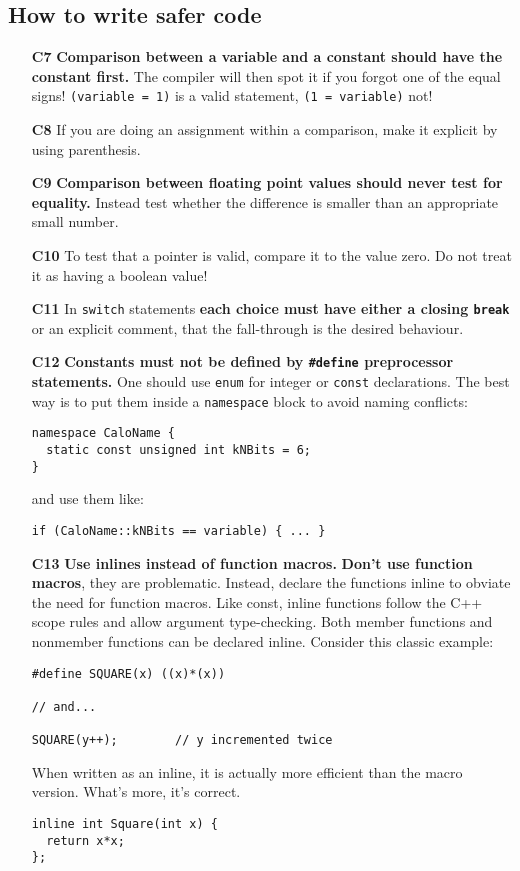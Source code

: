 \documentclass[a4paper,10pt]{article}
\begin{document}
\subsection{How to write safer code}
\begin{itemize}
\item[\bf C7] {\bf Comparison between a variable and a constant should have
  the constant first.} The compiler will then spot it if you forgot one of
  the equal signs! {\tt (variable = 1)} is a valid statement,
  {\tt (1 = variable)} not!
\item[\bf C8] If you are doing an assignment within a comparison, make it
  explicit by using parenthesis.
\item[\bf C9] {\bf Comparison between floating point values should never test
  for equality.} Instead test whether the difference is smaller than an
  appropriate small number.
\item[\bf C10] To test that a pointer is valid, compare it to the value zero.
  Do not treat it as having a boolean value!
\item[\bf C11] In {\tt switch} statements {\bf each choice must have either
  a closing {\tt break}} or an explicit comment, that the fall-through is
  the desired behaviour.
\item[\bf C12] {\bf Constants must not be defined by {\tt \#define} preprocessor
  statements.} One should use {\tt enum} for integer or {\tt const} declarations.
  The best way is to put them inside a {\tt namespace} block to avoid
  naming conflicts:
  \begin{verbatim}
namespace CaloName {
  static const unsigned int kNBits = 6;
}
  \end{verbatim}
  and use them like:
  \begin{verbatim}
if (CaloName::kNBits == variable) { ... }
  \end{verbatim}
\item[\bf C13] {\bf Use inlines instead of function macros.} {\bf Don't use
  function macros}, they are problematic. Instead, declare the functions
  inline to obviate the need for function macros.
  Like const, inline functions follow the C++ scope rules and allow argument
  type-checking. Both member functions and nonmember functions can be
  declared inline. Consider this classic example:
  \begin{verbatim}
#define SQUARE(x) ((x)*(x))

// and...

SQUARE(y++);        // y incremented twice
  \end{verbatim}
  When written as an inline, it is actually more efficient than the macro
  version. What's more, it's correct.
  \begin{verbatim}
inline int Square(int x) {
  return x*x;
};


\end{verbatim}
\end{itemize}
\end{document}
